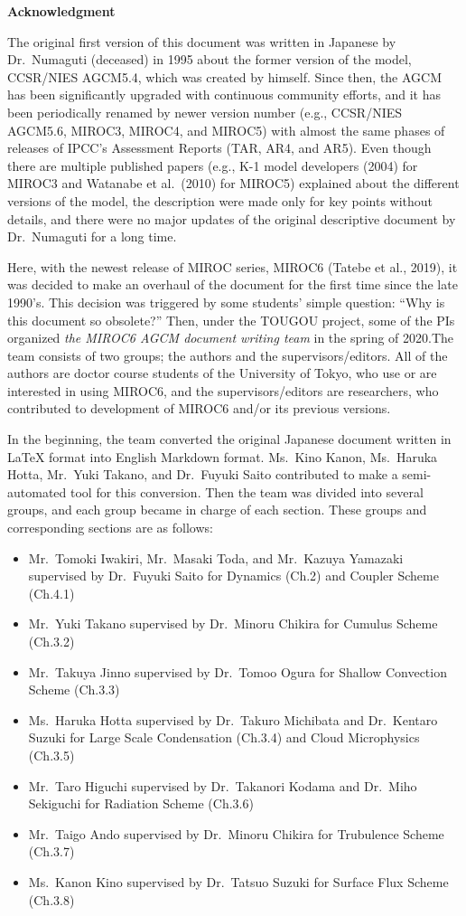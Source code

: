 \textbf{Acknowledgment}

The original first version of this document was written in Japanese by
Dr.~Numaguti (deceased) in 1995 about the former version of the model,
CCSR/NIES AGCM5.4, which was created by himself. Since then, the AGCM
has been significantly upgraded with continuous community efforts, and
it has been periodically renamed by newer version number (e.g.,
CCSR/NIES AGCM5.6, MIROC3, MIROC4, and MIROC5) with almost the same
phases of releases of IPCC's Assessment Reports (TAR, AR4, and AR5).
Even though there are multiple published papers (e.g., K-1 model
developers (2004) for MIROC3 and Watanabe et al.~(2010) for MIROC5)
explained about the different versions of the model, the description
were made only for key points without details, and there were no major
updates of the original descriptive document by Dr.~Numaguti for a long
time.

Here, with the newest release of MIROC series, MIROC6 (Tatebe et al.,
2019), it was decided to make an overhaul of the document for the first
time since the late 1990's. This decision was triggered by some
students' simple question: ``Why is this document so obsolete?'' Then,
under the TOUGOU project, some of the PIs organized \emph{the MIROC6
AGCM document writing team} in the spring of 2020.The team consists of
two groups; the authors and the supervisors/editors. All of the authors
are doctor course students of the University of Tokyo, who use or are
interested in using MIROC6, and the supervisors/editors are researchers,
who contributed to development of MIROC6 and/or its previous versions.

In the beginning, the team converted the original Japanese document
written in LaTeX format into English Markdown format. Ms.~Kino Kanon,
Ms.~Haruka Hotta, Mr.~Yuki Takano, and Dr.~Fuyuki Saito contributed to
make a semi-automated tool for this conversion. Then the team was
divided into several groups, and each group became in charge of each
section. These groups and corresponding sections are as follows:

\begin{itemize}
\item
  Mr.~Tomoki Iwakiri, Mr.~Masaki Toda, and Mr.~Kazuya Yamazaki
  supervised by Dr.~Fuyuki Saito for Dynamics (Ch.2) and Coupler Scheme
  (Ch.4.1)
\item
  Mr.~Yuki Takano supervised by Dr.~Minoru Chikira for Cumulus Scheme
  (Ch.3.2)
\item
  Mr.~Takuya Jinno supervised by Dr.~Tomoo Ogura for Shallow Convection
  Scheme (Ch.3.3)
\item
  Ms.~Haruka Hotta supervised by Dr.~Takuro Michibata and Dr.~Kentaro
  Suzuki for Large Scale Condensation (Ch.3.4) and Cloud Microphysics
  (Ch.3.5)
\item
  Mr.~Taro Higuchi supervised by Dr.~Takanori Kodama and Dr.~Miho
  Sekiguchi for Radiation Scheme (Ch.3.6)
\item
  Mr.~Taigo Ando supervised by Dr.~Minoru Chikira for Trubulence Scheme
  (Ch.3.7)
\item
  Ms.~Kanon Kino supervised by Dr.~Tatsuo Suzuki for Surface Flux Scheme
  (Ch.3.8)
\end{itemize}

